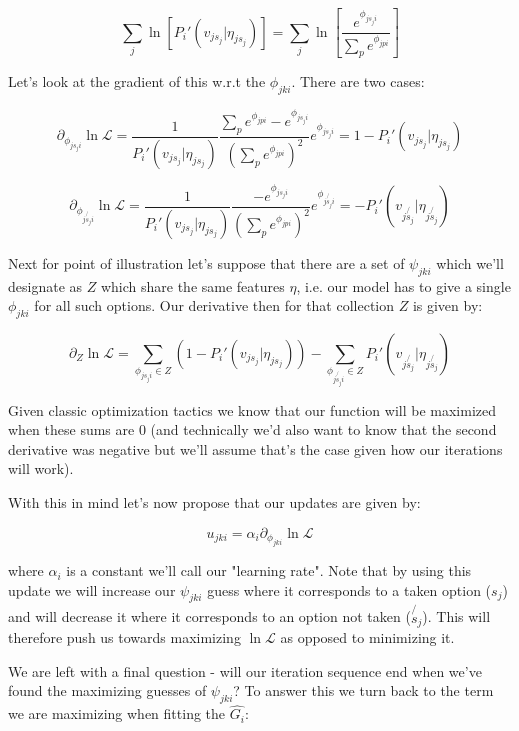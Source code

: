 \documentclass[11pt]{article}
\begin{document}
$$\sum_j \ln{\left[ P_i'(v_{js_j} | \eta_{js_j}) \right]}= \sum_j \ln{\left[ \frac{e^{\phi_{js_ji}}}{\sum_p e^{\phi_{jpi}}} \right]}$$

Let's look at the gradient of this w.r.t the $\phi_{jki}$. There are two cases:

$$\partial_{\phi_{js_ji}}\ln{\mathcal{L}}
=
\frac{1}{P_i'(v_{js_j} | \eta_{js_j})}\frac{\sum_p e^{\phi_{jpi}}-e^{\phi_{js_ji}}}{\left( \sum_p e^{\phi_{jpi}} \right)^2} e^{\phi_{js_ji}}
=
1-P_i'(v_{js_j} | \eta_{js_j}) $$ 

$$\partial_{\phi_{j\not{s_j}i}}\ln{\mathcal{L}}
=
\frac{1}{P_i'(v_{js_j} | \eta_{js_j})}\frac{-e^{\phi_{js_ji}}}{\left( \sum_p e^{\phi_{jpi}} \right)^2} e^{\phi_{j\not{s_j}i}}
= 
-P_i'(v_{j\not{s_j}} | \eta_{j\not{s_j}})$$ 

Next for point of illustration let's suppose that there are a set of $\psi_{jki}$ which we'll designate as $Z$ which share the same features $\eta$, i.e. our model has to give a single $\phi_{jki}$ for all such options. Our derivative then for that collection $Z$ is given by:

$$\partial_Z \ln{\mathcal{L}}=\sum_{\phi_{js_ji} \in Z}\left(1-P_i'(v_{js_j} | \eta_{js_j}) \right)-\sum_{\phi_{j\not{s_j}i}\in Z}P_i'(v_{j\not{s_j}} | \eta_{j\not{s_j}})$$

Given classic optimization tactics we know that our function will be maximized when these sums are $0$ (and technically we'd also want to know that the second derivative was negative but we'll assume that's the case given how our iterations will work). \newline

With this in mind let's now propose that our updates are given by:

$$u_{jki} = \alpha_i \partial_{\phi_{jki}} \ln{\mathcal{L}} $$

where $\alpha_i$ is a constant we'll call our "learning rate". Note that by using this update we will increase our $\psi_{jki}$ guess where it corresponds to a taken option ($s_j$) and will decrease it where it corresponds to an option not taken ($\not{s_j}$). This will therefore push us towards maximizing $\ln{\mathcal{L}}$ as opposed to minimizing it. \newline

We are left with a final question - will our iteration sequence end when we've found the maximizing guesses of $\psi_{jki}$? To answer this we turn back to the term we are maximizing when fitting the $\hat{G_i}$: 
\end{document}
